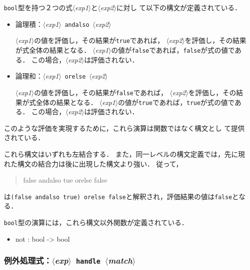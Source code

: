 \documentclass{jbook}
\newcommand{\code}[1]{\mbox{\large\tt #1}}
\newcommand{\nonterm}[1]{\mbox{$\langle$}{\it #1}\mbox{$\rangle$}}
\newcommand{\term}[1]{\mbox{{\tt #1}}}
\newenvironment{program}{\begin{quote}\begin{tt}}%
                        {\end{tt}\end{quote}}
\begin{document}
	\code{bool}型を持つ２つの式\nonterm{exp1}と\nonterm{exp2}に対し
て以下の構文が定義されている．
\begin{itemize}
\item 論理積：\nonterm{exp1}\ \term{andalso}\ \nonterm{exp2} 

\nonterm{exp1}の値を評価し，その結果が\code{true}であれば，
\nonterm{exp2}を評価し，その結果が式全体の結果となる．
\nonterm{exp1}の値が\code{false}であれば，\code{false}が式の値である．
	この場合，\nonterm{exp2}は評価されない．

\item 論理和：\nonterm{exp1}\ \term{orelse}\ \nonterm{exp2}

	\nonterm{exp1}の値を評価し，その結果が\code{false}であれば，
\nonterm{exp2}を評価し，その結果が式全体の結果となる．
\nonterm{exp1}の値が\code{true}であれば，\code{true}が式の値である．
	この場合，\nonterm{exp2}は評価されない．
\end{itemize}
	このような評価を実現するために，これら演算は関数ではなく構文とし
て提供されている．

	これら構文はいずれも左結合する．
	また，同一レベルの構文定義では，先に現れた構文の結合力は後に出現した構文より強い．
	従って，
\begin{program}
false andalso tue orelse false
\end{program}
は\code{(false andalso true) orelse false}と解釈され，評価結果の値は\code{false}となる．

	\code{bool}型の演算には，これら構文以外関数が定義されている．
\begin{itemize}
\item not : bool -> bool
\end{itemize}

\subsubsection{例外処理式：\nonterm{exp}\ \term{handle}\ \nonterm{match}}
\label{sec:expression:handle}
\end{document}
